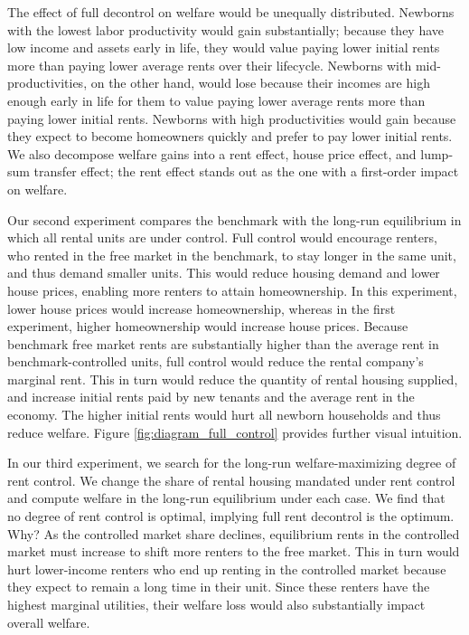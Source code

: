 \documentclass[parskip=full]{article}
\begin{document}
The effect of full decontrol on welfare would be unequally distributed. Newborns with the lowest labor productivity would gain substantially; because they have low income and assets early in life, they would value paying lower initial rents more than paying lower average rents over their lifecycle. Newborns with mid-productivities, on the other hand, would lose because their incomes are high enough early in life for them to value paying lower average rents more than paying lower initial rents. Newborns with high productivities would gain because they expect to become homeowners quickly and prefer to pay lower initial rents. We also decompose welfare gains into a rent effect, house price effect, and lump-sum transfer effect; the rent effect stands out as the one with a first-order impact on welfare. 

Our second experiment compares the benchmark with the long-run equilibrium in which all rental units are under control. Full control would encourage renters, who rented in the free market in the benchmark, to stay longer in the same unit, and thus demand smaller units. This would reduce housing demand and lower house prices, enabling more renters to attain homeownership. In this experiment, lower house prices would increase homeownership, whereas in the first experiment, higher homeownership would increase house prices. Because benchmark free market rents are substantially higher than the average rent in benchmark-controlled units, full control would reduce the rental company's marginal rent. This in turn would reduce the quantity of rental housing supplied, and increase initial rents paid by new tenants and the average rent in the economy. The higher initial rents would hurt all newborn households and thus reduce welfare. Figure \ref{fig:diagram_full_control} provides further visual intuition.

In our third experiment, we search for the long-run welfare-maximizing degree of rent control. We change the share of rental housing mandated under rent control and compute welfare in the long-run equilibrium under each case. We find that no degree of rent control is optimal, implying full rent decontrol is the optimum. Why? As the controlled market share declines, equilibrium rents in the controlled market must increase to shift more renters to the free market. This in turn would hurt lower-income renters who end up renting in the controlled market because they expect to remain a long time in their unit. Since these renters have the highest marginal utilities, their welfare loss would also substantially impact overall welfare. 
\end{document}
